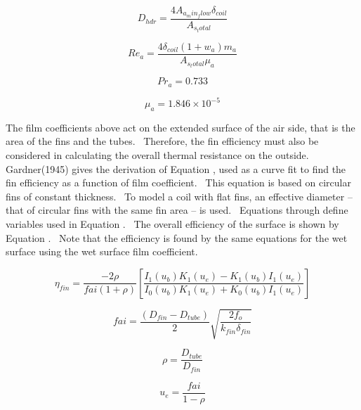 \begin{equation}
{D_{hdr}} = \frac{{4{A_{a_min_flow}}{\delta_{coil}}}}{{{A_{s_total}}}}
\end{equation}

\begin{equation}
R{e_a} = \frac{{4{\delta_{coil}}\left( {1 + {w_a}} \right){m_a}}}{{{A_{s_total}}{\mu_a}}}
\end{equation}

\begin{equation}
P{r_a} = 0.733
\end{equation}

\begin{equation}
{\mu_a} = 1.846 \times {10^{ - 5}}
\end{equation}

The film coefficients above act on the extended surface of the air side, that is the area of the fins and the tubes.~ Therefore, the fin efficiency must also be considered in calculating the overall thermal resistance on the outside.~ Gardner(1945) gives the derivation of Equation , used as a curve fit to find the fin efficiency as a function of film coefficient.~ This equation is based on circular fins of constant thickness.~ To model a coil with flat fins, an effective diameter -- that of circular fins with the same fin area -- is used.~ Equations through define variables used in Equation .~ The overall efficiency of the surface is shown by Equation .~ Note that the efficiency is found by the same equations for the wet surface using the wet surface film coefficient.

\begin{equation}
{\eta_{fin}} = \frac{{ - 2\rho }}{{fai(1 + \rho )}}\left[ {\frac{{{I_1}({u_b}){K_1}({u_e}) - {K_1}({u_b}){I_1}({u_e})}}{{{I_0}({u_b}){K_1}({u_e}) + {K_0}({u_b}){I_1}({u_e})}}} \right]
\end{equation}

\begin{equation}
fai = \frac{{({D_{fin}} - {D_{tube}})}}{2}\sqrt {\frac{{2{f_o}}}{{{k_{fin}}{\delta_{fin}}}}}
\end{equation}

\begin{equation}
\rho  = \frac{{{D_{tube}}}}{{{D_{fin}}}}
\end{equation}

\begin{equation}
{u_e} = \frac{{fai}}{{1 - \rho }}
\end{equation}

